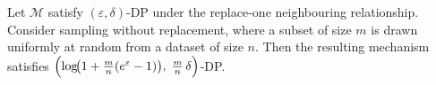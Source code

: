 Let $\mathcal{M}$ satisfy $(\varepsilon,\delta)$-DP under the replace-one neighbouring relationship. Consider sampling without replacement, where a subset of size $m$ is drawn uniformly at random from a dataset of size $n$. Then the resulting mechanism satisfies $\Bigl(\log\!\bigl(1+\tfrac{m}{n}(e^{\varepsilon}-1)\bigr),\; \tfrac{m}{n}\,\delta\Bigr)$-DP.